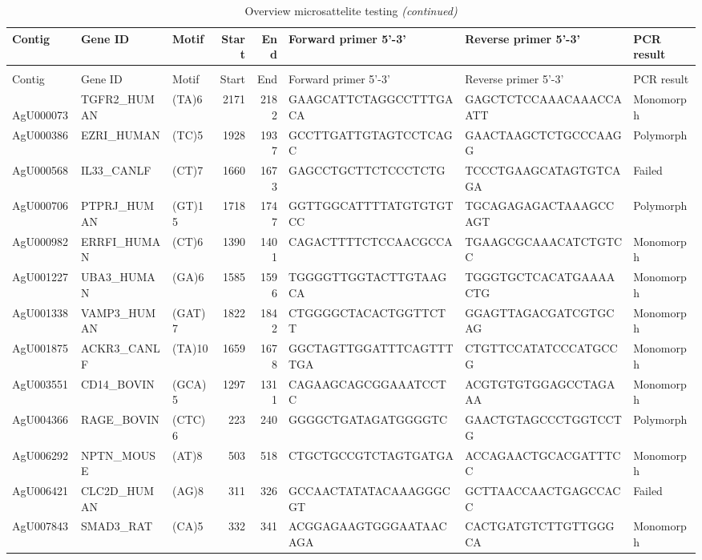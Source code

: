 \documentclass[]{article}
\begin{document}
\begin{longtable}[t]{lllrrlll}
\caption{\label{tab:unnamed-chunk-11}Overview microsattelite testing}\\
\toprule
Contig & Gene ID & Motif & Start & End & Forward primer 5'-3' & Reverse primer 5'-3' & PCR result\\
\midrule
\endfirsthead
\caption[]{Overview microsattelite testing \textit{(continued)}}\\
\toprule
Contig & Gene ID & Motif & Start & End & Forward primer 5'-3' & Reverse primer 5'-3' & PCR result\\
\midrule
\endhead
\
\endfoot
\bottomrule
\endlastfoot
AgU000073 & TGFR2\_HUMAN & (TA)6 & 2171 & 2182 & GAAGCATTCTAGGCCTTTGACA & GAGCTCTCCAAACAAACCAATT & Monomorph\\
AgU000386 & EZRI\_HUMAN & (TC)5 & 1928 & 1937 & GCCTTGATTGTAGTCCTCAGC & GAACTAAGCTCTGCCCAAGG & Polymorph\\
AgU000568 & IL33\_CANLF & (CT)7 & 1660 & 1673 & GAGCCTGCTTCTCCCTCTG & TCCCTGAAGCATAGTGTCAGA & Failed\\
AgU000706 & PTPRJ\_HUMAN & (GT)15 & 1718 & 1747 & GGTTGGCATTTTATGTGTGTCC & TGCAGAGAGACTAAAGCCAGT & Polymorph\\
AgU000982 & ERRFI\_HUMAN & (CT)6 & 1390 & 1401 & CAGACTTTTCTCCAACGCCA & TGAAGCGCAAACATCTGTCC & Monomorph\\
\addlinespace
AgU001227 & UBA3\_HUMAN & (GA)6 & 1585 & 1596 & TGGGGTTGGTACTTGTAAGCA & TGGGTGCTCACATGAAAACTG & Monomorph\\
AgU001338 & VAMP3\_HUMAN & (GAT)7 & 1822 & 1842 & CTGGGGCTACACTGGTTCTT & GGAGTTAGACGATCGTGCAG & Monomorph\\
AgU001875 & ACKR3\_CANLF & (TA)10 & 1659 & 1678 & GGCTAGTTGGATTTCAGTTTTGA & CTGTTCCATATCCCATGCCG & Monomorph\\
AgU003551 & CD14\_BOVIN & (GCA)5 & 1297 & 1311 & CAGAAGCAGCGGAAATCCTC & ACGTGTGTGGAGCCTAGAAA & Monomorph\\
AgU004366 & RAGE\_BOVIN & (CTC)6 & 223 & 240 & GGGGCTGATAGATGGGGTC & GAACTGTAGCCCTGGTCCTG & Polymorph\\
\addlinespace
AgU006292 & NPTN\_MOUSE & (AT)8 & 503 & 518 & CTGCTGCCGTCTAGTGATGA & ACCAGAACTGCACGATTTCC & Monomorph\\
AgU006421 & CLC2D\_HUMAN & (AG)8 & 311 & 326 & GCCAACTATATACAAAGGGCGT & GCTTAACCAACTGAGCCACC & Failed\\
AgU007843 & SMAD3\_RAT & (CA)5 & 332 & 341 & ACGGAGAAGTGGGAATAACAGA & CACTGATGTCTTGTTGGGCA & Monomorph\\

\end{longtable}
\end{document}
